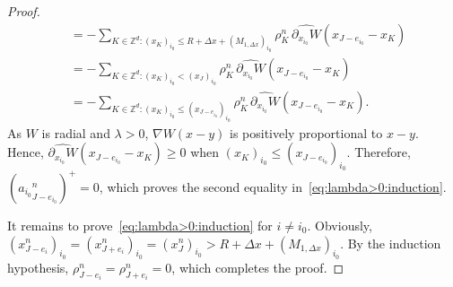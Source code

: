 \documentclass[11pt]{article}
\theoremstyle{definition}
\numberwithin{equation}{section}
\newcommand*\ZZ{\mathbb{Z}}
\newcommand*\pa{\partial}
\newcommand*\mIn{M_{1,\Delta x}}
\begin{document}
\begin{proof}
\begin{equation*}
\begin{split}
&= -\sum_{K\in \ZZ^d : (x_{K})_{i_{0}} \le R + \Delta x + (\mIn{})_{i_{0}}}
\rho_{K}^n \, \widehat{\pa_{x_{i_{0}}} W}(x_{J-e_{i_{0}}}-x_K )
\\
&= -\sum_{K\in \ZZ^d : (x_{K})_{i_{0}} < (x_{J})_{i_{0}}} \rho_{K}^n \, \widehat{\pa_{x_{i_{0}}} W}(x_{J-e_{i_{0}}}-x_K )
\\
&= -\sum_{K\in \ZZ^d : (x_{K})_{i_{0}} \leq (x_{J-e_{i_{0}}})_{i_{0}}} \rho_{K}^n \, \widehat{\pa_{x_{i_{0}}} W}(x_{J-e_{i_{0}}}-x_K ).
\end{split}
\end{equation*}
As $W$ is radial and $\lambda >0$, $\nabla W(x - y)$ is positively proportional to $x-y$. Hence, $\widehat{\pa_{x_{i_{0}}} W}(x_{J-e_{i_{0}}}-x_K) \geq 0$ when $(x_{K})_{i_{0}} \leq (x_{J-e_{i_{0}}})_{i_{0}}$. Therefore, $({a_{i_{0}}}^n_{J-e_{i_{0}}})^{+}=0$, which proves the second equality in~\eqref{eq:lambda>0:induction}.

It remains to prove~\eqref{eq:lambda>0:induction} for $i \not = i_{0}$. Obviously, $(x^n_{J-e_{i}})_{i_{0}}= (x^n_{J+e_{i}})_{i_{0}} = (x^n_{J})_{i_{0}} > R + \Delta x + (\mIn{})_{i_{0}}$. By the induction hypothesis, $\rho^n_{J-e_{i}} =
\rho^n_{J+e_{i}} = 0$, which completes the proof.
\end{proof}
\end{document}

